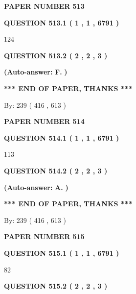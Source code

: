 \documentclass{ctexart}
\begin{document}
   
\newpage 
\setcounter{page}{ 
   513001 } 
   
   
 {\textbf{ \Large{ PAPER NUMBER  513  }}}
   
   
   
   
  
  
{\textbf{\large{QUESTION
513.1 
 ( 1 , 1 , 6791 )
}}}

124
  
  
{\textbf{\large{QUESTION
513.2 
 ( 2 , 2 , 3 )
}}}
 
 
{\textbf{(Auto-answer:}}
{\textbf{\large{
F.}}}
{\textbf{)}}
 
 
   
   
   
   
\vspace{1.0in} 
{\textbf{\large{ *** END OF PAPER, THANKS *** }}} 
   
   
\hspace{1.0in} By: 
 239 ( 416 ,  613 )
   
   
   
   
\newpage 
\setcounter{page}{ 
   514001 } 
   
   
 {\textbf{ \Large{ PAPER NUMBER  514  }}}
   
   
   
   
  
  
{\textbf{\large{QUESTION
514.1 
 ( 1 , 1 , 6791 )
}}}

113
  
  
{\textbf{\large{QUESTION
514.2 
 ( 2 , 2 , 3 )
}}}
 
 
{\textbf{(Auto-answer:}}
{\textbf{\large{
A.}}}
{\textbf{)}}
 
 
   
   
   
   
\vspace{1.0in} 
{\textbf{\large{ *** END OF PAPER, THANKS *** }}} 
   
   
\hspace{1.0in} By: 
 239 ( 416 ,  613 )
   
   
   
   
\newpage 
\setcounter{page}{ 
   515001 } 
   
   
 {\textbf{ \Large{ PAPER NUMBER  515  }}}
   
   
   
   
  
  
{\textbf{\large{QUESTION
515.1 
 ( 1 , 1 , 6791 )
}}}

82
  
  
{\textbf{\large{QUESTION
515.2 
 ( 2 , 2 , 3 )
}}}
 
\end{document}
